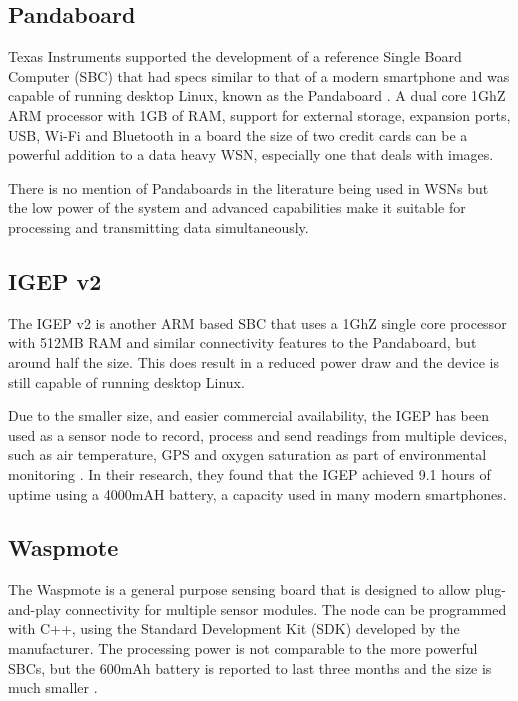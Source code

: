 \subsection{Pandaboard}

Texas Instruments supported the development of a reference Single Board Computer (SBC) that had specs similar to that of a modern smartphone and was capable of running desktop Linux, known as the Pandaboard \cite{instruments2012pandaboard}. A dual core 1GhZ ARM processor with 1GB of RAM, support for external storage, expansion ports, USB, Wi-Fi and Bluetooth in a board the size of two credit cards can be a powerful addition to a data heavy WSN, especially one that deals with images.

There is no mention of Pandaboards in the literature being used in WSNs but the low power of the system and advanced capabilities make it suitable for processing and transmitting data simultaneously. 
	
\subsection{IGEP v2}

The IGEP v2 is another ARM based SBC that uses a 1GhZ single core processor with 512MB RAM and similar connectivity features to the Pandaboard, but around half the size. This does result in a reduced power draw and the device is still capable of running desktop Linux.

Due to the smaller size, and easier commercial availability, the IGEP has been used as a sensor node to record, process and send readings from multiple devices, such as air temperature, GPS and oxygen saturation as part of environmental monitoring \cite{Resch}. In their research, they found that the IGEP achieved 9.1 hours of uptime using a 4000mAH battery, a capacity used in many modern smartphones.

\subsection{Waspmote}
The Waspmote is a general purpose sensing board that is designed to allow plug-and-play connectivity for multiple sensor modules. The node can be programmed with C++, using the Standard Development Kit (SDK) developed by the manufacturer. The processing power is not comparable to the more powerful SBCs, but the 600mAh battery is reported to last three months and the size is much smaller \cite{waspmote}.


